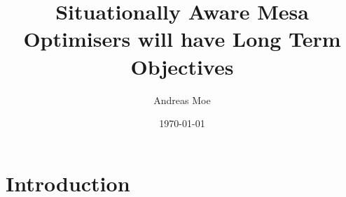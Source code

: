 \documentclass[11pt]{article}
\title{Situationally Aware Mesa Optimisers will have Long Term Objectives}
\author{Andreas Moe}
\date{\today}
\begin{document}
\maketitle

\section*{Introduction}
\end{document}
